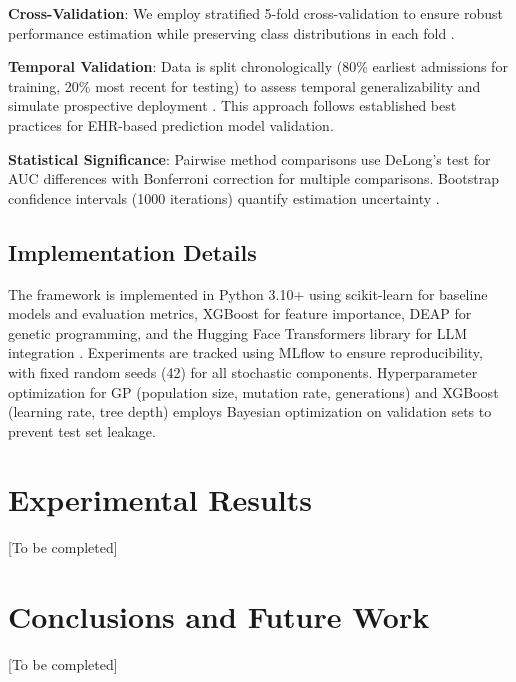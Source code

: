 \documentclass[12pt,a4paper]{article}
\begin{document}
\textbf{Cross-Validation}: We employ stratified 5-fold cross-validation to ensure robust performance estimation while preserving class distributions in each fold \cite{ref21,ref22}.

\textbf{Temporal Validation}: Data is split chronologically (80\% earliest admissions for training, 20\% most recent for testing) to assess temporal generalizability and simulate prospective deployment \cite{ref11,ref30}. This approach follows established best practices for EHR-based prediction model validation.

\textbf{Statistical Significance}: Pairwise method comparisons use DeLong's test for AUC differences with Bonferroni correction for multiple comparisons. Bootstrap confidence intervals (1000 iterations) quantify estimation uncertainty \cite{ref19}.

\subsection{Implementation Details}

The framework is implemented in Python 3.10+ using scikit-learn for baseline models and evaluation metrics, XGBoost for feature importance, DEAP for genetic programming, and the Hugging Face Transformers library for LLM integration \cite{ref21,ref22}. Experiments are tracked using MLflow to ensure reproducibility, with fixed random seeds (42) for all stochastic components. Hyperparameter optimization for GP (population size, mutation rate, generations) and XGBoost (learning rate, tree depth) employs Bayesian optimization on validation sets to prevent test set leakage.

\section{Experimental Results}
[To be completed]

\section{Conclusions and Future Work}
[To be completed]



\end{document}
